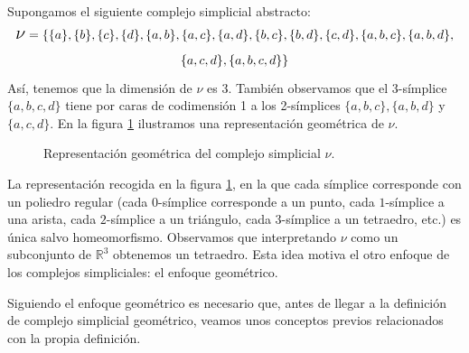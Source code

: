 \documentclass[12pt, a4paper, twoside]{book}
\numberwithin{equation}{section}
\theoremstyle{definition}
\newenvironment{ejem}
  {\pushQED{\qed}\renewcommand{\qedsymbol}{$\blacktriangleleft$}\ejemplo}
  {\popQED\endejemplo}
\theoremstyle{remark}
\theoremstyle{plain}
\begin{document}
	\begin{ejem}
		\label{ejem:1}
		Supongamos el siguiente complejo simplicial abstracto:
		\begin{multline*} 
			\text{{\Large $\nu$}}=\{\{a\},\{b\},\{c\},\{d\},
			\{a,b\},\{a,c\},\{a,d\},\{b,c\},\{b,d\},\{c,d\},
			\{a,b,c\},\{a,b,d\},\\
			\{a,c,d\},\{a,b,c,d\}\}
		\end{multline*}
		Así, tenemos que la dimensión de {\Large $\nu$} es 3. También 
		observamos que el 3-símplice $\{a,b,c,d\}$ tiene por caras de 
		codimensión 1 a los 2-símplices $\{a,b,c\},\{a,b,d\}$ y 
		$\{a,c,d\}$. En la figura \ref{fig:tetra} ilustramos una 
		representación geométrica de {\Large $\nu$}.

		\begin{figure}[H]
			\centering
			\caption{Representación geométrica del complejo simplicial {\Large $\nu$}.}
			\label{fig:tetra}
		\end{figure}

		La representación recogida en la figura \ref{fig:tetra}, en la
		que cada símplice corresponde con un poliedro regular (cada 
		$0$-símplice corresponde a un punto, cada $1$-símplice a una 
		arista, cada $2$-símplice a un triángulo, cada $3$-símplice a 
		un tetraedro, etc.) es única salvo homeomorfismo. Observamos 
		que interpretando {\Large $\nu$} como un subconjunto de 
		$\mathbb{R}^{3}$ obtenemos un tetraedro. Esta idea motiva el 
		otro enfoque de los complejos simpliciales: el enfoque 
		geométrico.
	\end{ejem}

	Siguiendo el enfoque geométrico es necesario que, antes de llegar a la
	definición de complejo simplicial geométrico, veamos unos conceptos 
	previos relacionados con la propia definición.
\end{document}
